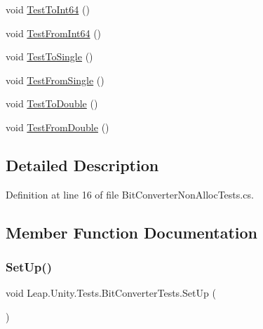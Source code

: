 \begin{DoxyCompactItemize}
\item 
void \mbox{\hyperlink{class_leap_1_1_unity_1_1_tests_1_1_bit_converter_tests_a176e7913bf26bd19f3dfe341e1883390}{Test\+To\+Int64}} ()
\item 
void \mbox{\hyperlink{class_leap_1_1_unity_1_1_tests_1_1_bit_converter_tests_a5fb887344c07c258e439cfc2ff349af8}{Test\+From\+Int64}} ()
\item 
void \mbox{\hyperlink{class_leap_1_1_unity_1_1_tests_1_1_bit_converter_tests_a36aae47dba48abf476acdb660cd4c51b}{Test\+To\+Single}} ()
\item 
void \mbox{\hyperlink{class_leap_1_1_unity_1_1_tests_1_1_bit_converter_tests_a828348650fb61975c8ff55e2afb20b4b}{Test\+From\+Single}} ()
\item 
void \mbox{\hyperlink{class_leap_1_1_unity_1_1_tests_1_1_bit_converter_tests_a22cf885ce832a5d32331aaf7c0ccb9ca}{Test\+To\+Double}} ()
\item 
void \mbox{\hyperlink{class_leap_1_1_unity_1_1_tests_1_1_bit_converter_tests_a06356676d9aaa8eea43e4c753218981c}{Test\+From\+Double}} ()
\end{DoxyCompactItemize}


\subsection{Detailed Description}


Definition at line 16 of file Bit\+Converter\+Non\+Alloc\+Tests.\+cs.



\subsection{Member Function Documentation}
\mbox{\label{class_leap_1_1_unity_1_1_tests_1_1_bit_converter_tests_a38158c62ddfc36d84fbf916abd532e9e}} 
\subsubsection{\texorpdfstring{SetUp()}{SetUp()}}
{\footnotesize\ttfamily void Leap.\+Unity.\+Tests.\+Bit\+Converter\+Tests.\+Set\+Up (\begin{DoxyParamCaption}{ }\end{DoxyParamCaption})}



